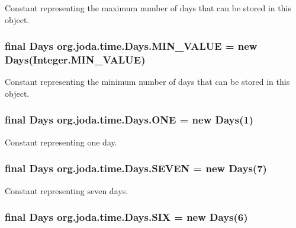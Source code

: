 Constant representing the maximum number of days that can be stored in this object. \hypertarget{classorg_1_1joda_1_1time_1_1_days_a4b97ba30b49f964a0991285a11a38998}{
\subsubsection[{M\-I\-N\-\_\-\-V\-A\-L\-U\-E}]{\setlength{\rightskip}{0pt plus 5cm}final {\bf Days} org.\-joda.\-time.\-Days.\-M\-I\-N\-\_\-\-V\-A\-L\-U\-E = new {\bf Days}(Integer.\-M\-I\-N\-\_\-\-V\-A\-L\-U\-E)\hspace{0.3cm}{\ttfamily [static]}}}\label{classorg_1_1joda_1_1time_1_1_days_a4b97ba30b49f964a0991285a11a38998}
Constant representing the minimum number of days that can be stored in this object. \hypertarget{classorg_1_1joda_1_1time_1_1_days_a062886b8436863becff5245ad7d9a810}{
\subsubsection[{O\-N\-E}]{\setlength{\rightskip}{0pt plus 5cm}final {\bf Days} org.\-joda.\-time.\-Days.\-O\-N\-E = new {\bf Days}(1)\hspace{0.3cm}{\ttfamily [static]}}}\label{classorg_1_1joda_1_1time_1_1_days_a062886b8436863becff5245ad7d9a810}
Constant representing one day. \hypertarget{classorg_1_1joda_1_1time_1_1_days_a593d447711a3960100e09d3a45148923}{
\subsubsection[{S\-E\-V\-E\-N}]{\setlength{\rightskip}{0pt plus 5cm}final {\bf Days} org.\-joda.\-time.\-Days.\-S\-E\-V\-E\-N = new {\bf Days}(7)\hspace{0.3cm}{\ttfamily [static]}}}\label{classorg_1_1joda_1_1time_1_1_days_a593d447711a3960100e09d3a45148923}
Constant representing seven days. \hypertarget{classorg_1_1joda_1_1time_1_1_days_ae5aced74fc2850cdbe99fa7e0f0ce039}{
\subsubsection[{S\-I\-X}]{\setlength{\rightskip}{0pt plus 5cm}final {\bf Days} org.\-joda.\-time.\-Days.\-S\-I\-X = new {\bf Days}(6)\hspace{0.3cm}{\ttfamily [static]}}}\label{classorg_1_1joda_1_1time_1_1_days_ae5aced74fc2850cdbe99fa7e0f0ce039}
